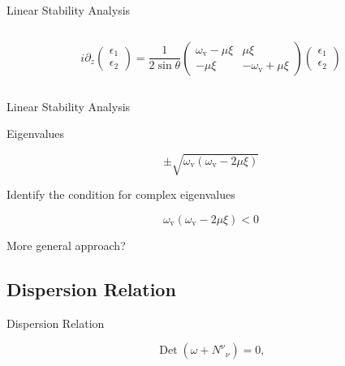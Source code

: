 \documentclass[9pt]{beamer}
\begin{document}
\begin{darkframes}
\begin{frame}{Linear Stability Analysis}
\begin{columns}[T]
\begin{column}{0.55\textwidth}
\small
\begin{equation*}
i\partial_{z}\begin{pmatrix}
\epsilon_1 \\
\epsilon_2
\end{pmatrix} = \frac{1}{2\sin\theta} \begin{pmatrix}
\omega_{\mathrm v} - \mu \xi &  \mu  \xi \\
-\mu \xi & -\omega_{\mathrm v} + \mu  \xi
\end{pmatrix}\begin{pmatrix}
\epsilon_1 \\
\epsilon_2
\end{pmatrix}
\end{equation*}


\end{column}


\end{columns}



\end{frame}


\begin{frame}{Linear Stability Analysis}


Eigenvalues

\begin{equation*}
   \pm \sqrt{ \omega_{\mathrm v} ( \omega_{\mathrm v}- 2\mu \xi ) }
\end{equation*}

Identify the condition for complex eigenvalues

\begin{equation*}
   \omega_{\mathrm v} ( \omega_{\mathrm v}- 2\mu \xi ) < 0
\end{equation*}

\pause

\begin{tcolorbox}
   \centering
   More general approach?
\end{tcolorbox}

\end{frame}


\subsection{Dispersion Relation}

\begin{frame}{Dispersion Relation}

\begin{equation*}
   \operatorname{Det}(\omega + N^{\nu}_{\phantom{\mu}\nu}) = 0,
\end{equation*}



\end{frame}
\end{darkframes}
\end{document}
